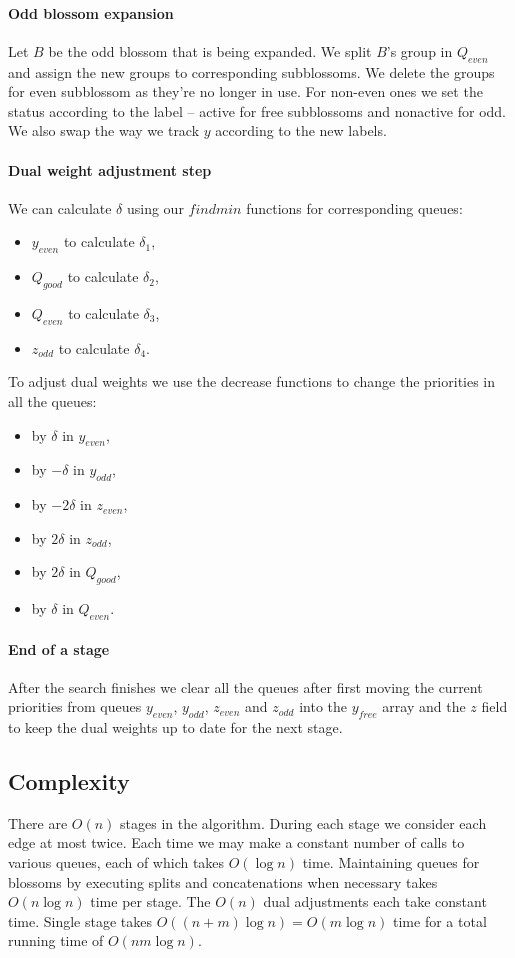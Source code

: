 \paragraph*{Odd blossom expansion} Let $B$ be the odd blossom that is being expanded. We split $B$'s group in $Q_{even}$ and assign the new groups to corresponding subblossoms. We delete the groups for even subblossom as they're no longer in use. For non-even ones we set the status according to the label – active for free subblossoms and nonactive for odd. We also swap the way we track $y$ according to the new labels.

\paragraph*{Dual weight adjustment step} We can calculate $\delta$ using our $findmin$ functions for corresponding queues: 
\begin{itemize}
    \item $y_{even}$ to calculate $\delta_1$,
    \item $Q_{good}$ to calculate $\delta_2$,
    \item $Q_{even}$ to calculate $\delta_3$,
    \item $z_{odd}$ to calculate $\delta_4$.
\end{itemize}

To adjust dual weights we use the decrease functions to change the priorities in all the queues:
\begin{itemize}
    \item by $\delta$ in $y_{even}$,
    \item by $-\delta$ in $y_{odd}$, 
    \item by $-2\delta$ in $z_{even}$,
    \item by $2\delta$ in $z_{odd}$,
    \item by $2\delta$ in $Q_{good}$,
    \item by $\delta$ in $Q_{even}$.
\end{itemize}

\paragraph*{End of a stage} After the search finishes we clear all the queues after first moving the current priorities from queues $y_{even}$, $y_{odd}$, $z_{even}$ and $z_{odd}$ into the $y_{free}$ array and the $z$ field to keep the dual weights up to date for the next stage.

\subsection{Complexity}

There are $O(n)$ stages in the algorithm. During each stage we consider each edge at most twice. Each time we may make a constant number of calls to various queues, each of which takes $O(\log n)$ time. Maintaining queues for blossoms by executing splits and concatenations when necessary takes $O(n \log n)$ time per stage. The $O(n)$ dual adjustments each take constant time. Single stage takes $O((n + m) \log n) = O(m \log n)$ time for a total running time of $O(nm \log n)$.